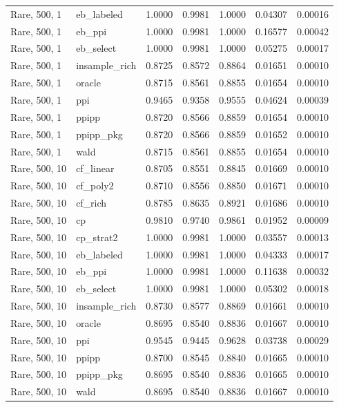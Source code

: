 \begin{longtable}{llrrrrr}
Rare, 500, 1 & eb\_labeled & 1.0000 & 0.9981 & 1.0000 & 0.04307 & 0.00016 \\
Rare, 500, 1 & eb\_ppi & 1.0000 & 0.9981 & 1.0000 & 0.16577 & 0.00042 \\
Rare, 500, 1 & eb\_select & 1.0000 & 0.9981 & 1.0000 & 0.05275 & 0.00017 \\
Rare, 500, 1 & insample\_rich & 0.8725 & 0.8572 & 0.8864 & 0.01651 & 0.00010 \\
Rare, 500, 1 & oracle & 0.8715 & 0.8561 & 0.8855 & 0.01654 & 0.00010 \\
Rare, 500, 1 & ppi & 0.9465 & 0.9358 & 0.9555 & 0.04624 & 0.00039 \\
Rare, 500, 1 & ppipp & 0.8720 & 0.8566 & 0.8859 & 0.01654 & 0.00010 \\
Rare, 500, 1 & ppipp\_pkg & 0.8720 & 0.8566 & 0.8859 & 0.01652 & 0.00010 \\
Rare, 500, 1 & wald & 0.8715 & 0.8561 & 0.8855 & 0.01654 & 0.00010 \\
Rare, 500, 10 & cf\_linear & 0.8705 & 0.8551 & 0.8845 & 0.01669 & 0.00010 \\
Rare, 500, 10 & cf\_poly2 & 0.8710 & 0.8556 & 0.8850 & 0.01671 & 0.00010 \\
Rare, 500, 10 & cf\_rich & 0.8785 & 0.8635 & 0.8921 & 0.01686 & 0.00010 \\
Rare, 500, 10 & cp & 0.9810 & 0.9740 & 0.9861 & 0.01952 & 0.00009 \\
Rare, 500, 10 & cp\_strat2 & 1.0000 & 0.9981 & 1.0000 & 0.03557 & 0.00013 \\
Rare, 500, 10 & eb\_labeled & 1.0000 & 0.9981 & 1.0000 & 0.04333 & 0.00017 \\
Rare, 500, 10 & eb\_ppi & 1.0000 & 0.9981 & 1.0000 & 0.11638 & 0.00032 \\
Rare, 500, 10 & eb\_select & 1.0000 & 0.9981 & 1.0000 & 0.05302 & 0.00018 \\
Rare, 500, 10 & insample\_rich & 0.8730 & 0.8577 & 0.8869 & 0.01661 & 0.00010 \\
Rare, 500, 10 & oracle & 0.8695 & 0.8540 & 0.8836 & 0.01667 & 0.00010 \\
Rare, 500, 10 & ppi & 0.9545 & 0.9445 & 0.9628 & 0.03738 & 0.00029 \\
Rare, 500, 10 & ppipp & 0.8700 & 0.8545 & 0.8840 & 0.01665 & 0.00010 \\
Rare, 500, 10 & ppipp\_pkg & 0.8695 & 0.8540 & 0.8836 & 0.01665 & 0.00010 \\
Rare, 500, 10 & wald & 0.8695 & 0.8540 & 0.8836 & 0.01667 & 0.00010 \\

\end{longtable}
